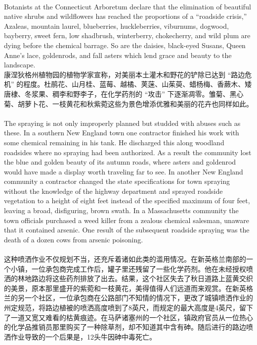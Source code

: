 \documentclass{article}
\begin{document}
\\
Botanists at the Connecticut Arboretum declare that the elimination of beautiful native shrubs and wildflowers has reached the proportions of a “roadside crisis,” Azaleas, mountain laurel, blueberries, huckleberries, viburnums, dogwood, bayberry, sweet fern, low shadbrush, winterberry, chokecherry, and wild plum are dying before the chemical barrage. So are the daisies, black-eyed Susans, Queen Anne’s lace, goldenrods, and fall asters which lend grace and beauty to the landscape.\\
康涅狄格州植物园的植物学家宣称，对美丽本土灌木和野花的铲除已达到 “路边危机” 的程度。杜鹃花、山月桂、蓝莓、越橘、荚蒾、山茱萸、蜡杨梅、香蕨木、矮唐棣、冬浆果、稠李和野李子，在化学药剂的 “攻击” 下逐渐凋零。雏菊、黑心菊、胡萝卜花、一枝黄花和秋紫菀这些为景色增添优雅和美丽的花卉也同样如此。 \\

\\
The spraying is not only improperly planned but studded with abuses such as these. In a southern New England town one contractor finished his work with some chemical remaining in his tank. He discharged this along woodland roadsides where no spraying had been authorized. As a result the community lost the blue and golden beauty of its autumn roads, where asters and goldenrod would have made a display worth traveling far to see. In another New England community a contractor changed the state specifications for town spraying without the knowledge of the highway department and sprayed roadside vegetation to a height of eight feet instead of the specified maximum of four feet, leaving a broad, disfiguring, brown swath. In a Massachusetts community the town officials purchased a weed killer from a zealous chemical salesman, unaware that it contained arsenic. One result of the subsequent roadside spraying was the death of a dozen cows from arsenic poisoning.\\\\
这种喷洒作业不仅规划不当，还充斥着诸如此类的滥用情况。在新英格兰南部的一个小镇，一位承包商完成工作后，罐子里还残留了一些化学药剂。他在未经授权喷洒的林地路边将这些药剂排放了出去。结果，这个社区失去了秋日道路上蓝黄交织的美景，原本那里盛开的紫菀和一枝黄花，美得值得人们远道而来观赏。在新英格兰的另一个社区，一位承包商在公路部门不知情的情况下，更改了城镇喷洒作业的州定规范，将路边植被的喷洒高度喷到了8英尺，而规定的最大高度是4英尺，留下了一道又宽又难看的枯黄痕迹。在马萨诸塞州的一个社区，镇政府官员从一位热心的化学品推销员那里购买了一种除草剂，却不知道其中含有砷。随后进行的路边喷洒作业导致的一个后果是，12头牛因砷中毒死亡。 \\
\end{document}
